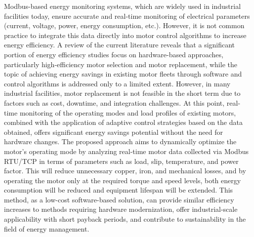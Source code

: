 Modbus-based energy monitoring systems, which are widely used in industrial facilities today, ensure accurate and real-time monitoring of electrical parameters (current, voltage, power, energy consumption, etc.). However, it is not common practice to integrate this data directly into motor control algorithms to increase energy efficiency. A review of the current literature reveals that a significant portion of energy efficiency studies focus on hardware-based approaches, particularly high-efficiency motor selection and motor replacement, while the topic of achieving energy savings in existing motor fleets through software and control algorithms is addressed only to a limited extent. However, in many industrial facilities, motor replacement is not feasible in the short term due to factors such as cost, downtime, and integration challenges. At this point, real-time monitoring of the operating modes and load profiles of existing motors, combined with the application of adaptive control strategies based on the data obtained, offers significant energy savings potential without the need for hardware changes. The proposed approach aims to dynamically optimize the motor's operating mode by analyzing real-time motor data collected via Modbus RTU/TCP in terms of parameters such as load, slip, temperature, and power factor. This will reduce unnecessary copper, iron, and mechanical losses, and by operating the motor only at the required torque and speed levels, both energy consumption will be reduced and equipment lifespan will be extended. This method, as a low-cost software-based solution, can provide similar efficiency increases to methods requiring hardware modernization, offer industrial-scale applicability with short payback periods, and contribute to sustainability in the field of energy management.  


\clearpage
